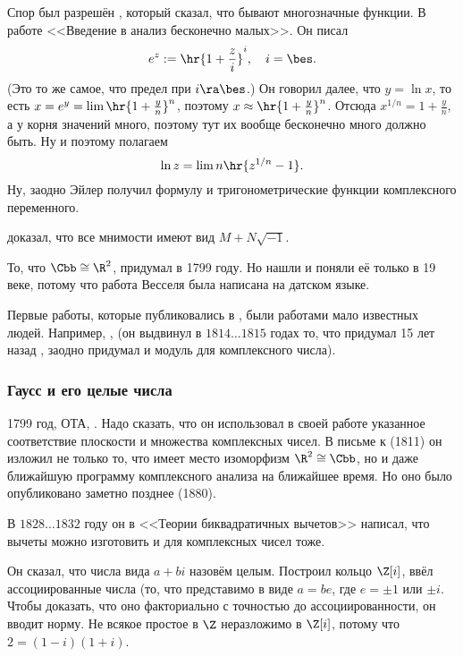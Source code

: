 \documentclass[a4paper,oneside,fleqn,10pt]{article}
\newcommand{\pe}[2]{${#1}\ldots{#2}$}
\begin{document}
Спор был разрешён , который сказал, что бывают
многозначные функции.  В работе <<Введение в анализ бесконечно
малых>>.  Он писал
$$e^z := \hr{1 + \frac{z}{i}}^i, \quad i = \bes.$$ (Это то же самое,
что предел при $i \ra \bes$.)  Он говорил далее, что $y = \ln x$, то
есть $x = e^y = \lim\hr{1 + \frac{y}{n}}^n$, поэтому $x \approx \hr{1
  + \frac{y}{n}}^n$.  Отсюда $x^{1/n} = 1 + \frac{y}{n}$, а у корня
значений много, поэтому тут их вообще бесконечно много должно быть. Ну
и поэтому полагаем
$$\ln z = \lim n \hr{z^{1/n} - 1}.$$ Ну, заодно Эйлер получил формулу
 и тригонометрические функции комплексного
переменного.

 доказал, что все мнимости имеют вид $M + N \sqrt{-1}$.

То, что $\Cbb \cong \R^2$, придумал    в 1799 году. Но нашли и
поняли её только в 19 веке, потому что работа Весселя была написана на
датском языке.

Первые работы, которые публиковались в , были работами мало
известных людей.  Например, ,  (он выдвинул в
\pe{1814}{1815} годах то, что придумал 15 лет назад ,
заодно придумал и модуль для комплексного числа).

\subsubsection{Гаусс и его целые числа}

1799 год, ОТА, . Надо сказать, что он использовал в своей
работе указанное соответствие плоскости и множества комплексных чисел.
В письме к  (1811) он изложил не только то,
что имеет место изоморфизм $\R^2 \cong \Cbb$, но и даже ближайшую
программу комплексного анализа на ближайшее время. Но оно было
опубликовано заметно позднее (1880).

В \pe{1828}{1832} году он в <<Теории биквадратичных вычетов>> написал,
что вычеты можно изготовить и для комплексных чисел тоже.

Он сказал, что числа вида $a+ bi$ назовём целым. Построил кольцо
$\Z[i]$, ввёл ассоциированные числа (то, что представимо в виде $a =
be$, где $e = \pm1$ или $\pm i$.  Чтобы доказать, что оно факториально
с точностью до ассоциированности, он вводит норму.  Не всякое простое
в $\Z$ неразложимо в $\Z[i]$, потому что $2 = (1-i)(1+i)$.
\end{document}
